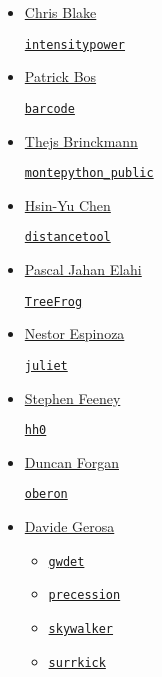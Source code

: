 \documentclass[11pt,a4paper]{article}
\begin{document}
\begin{itemize}
\item \href{https://github.com/cblakeastro}{Chris Blake}
  \begin{itemize}
    \href{https://github.com/cblakeastro/intensitypower}{{\tt intensitypower}}
  \end{itemize}

\item \href{https://github.com/egpbos}{Patrick Bos}
  \begin{itemize}
    \href{https://github.com/egpbos/barcode}{{\tt barcode}}
  \end{itemize}

\item \href{https://github.com/brinckmann}{Thejs Brinckmann}
  \begin{itemize}
    \href{https://github.com/brinckmann/montepython\_public}{{\tt montepython\_public}}
  \end{itemize}
  
\item \href{https://github.com/hsinyuc}{Hsin-Yu Chen} 
  \begin{itemize}
    \href{https://github.com/hsinyuc/distancetool}{\tt distancetool}
  \end{itemize}

\item \href{https://github.com/pelahi}{Pascal Jahan Elahi} 
  \begin{itemize}
   \href{https://github.com/pelahi/TreeFrog}{\tt TreeFrog}
  \end{itemize}

\item \href{https://github.com/nespinoza}{Nestor Espinoza}
  \begin{itemize}
    \href{https://github.com/nespinoza/juliet}{\tt juliet}
  \end{itemize}

\item \href{https://github.com/sfeeney}{Stephen Feeney}
  \begin{itemize}
    \href{https://github.com/sfeeney/hh0}{{\tt hh0}}
  \end{itemize}

\item \href{https://github.com/dh4gan/}{Duncan Forgan}
  \begin{itemize}
    \href{https://github.com/dh4gan/oberon}{\tt oberon}
  \end{itemize}

\item \href{https://github.com/dgerosa/}{Davide Gerosa}
  \begin{itemize}
   \item \href{https://github.com/dgerosa/gwdet}{\tt gwdet}
   \item \href{https://github.com/dgerosa/precession}{\tt precession}
   \item \href{https://github.com/dgerosa/skywalker}{\tt skywalker}
   \item \href{https://github.com/dgerosa/surrkick}{\tt surrkick}


\end{itemize}
\end{itemize}
\end{document}
